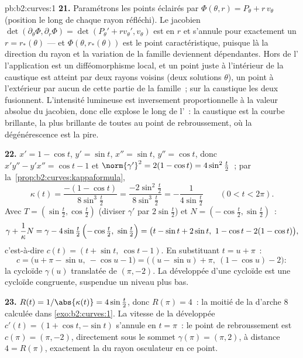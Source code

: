 \begin{solution}{pb:b2:curves:1}
\textbf{21.} Paramétrons les points éclairés par
$\Phi(\theta, r) = P_\theta + r\,v_\theta$ (position le long
de chaque rayon réfléchi). Le  jacobien
$\det(\partial_\theta\Phi, \partial_r\Phi) =
\det(P_\theta' + rv_\theta', v_\theta)$ est  en $r$ et
s'annule pour exactement un $r = r_*(\theta)$ --- et
$\Phi(\theta, r_*(\theta))$ est le point caractéristique, puisque
là la direction du rayon et la variation de la famille deviennent
dépendantes. Hors de l' l'application est un
difféomorphisme local, et un point juste à l'intérieur de la
caustique est atteint par deux rayons voisins
(deux solutions $\theta$), un point à l'extérieur par aucun de
cette partie de la famille~; sur la caustique les deux fusionnent.
L'intensité lumineuse est inversement proportionnelle à la valeur
absolue du jacobien, donc elle explose le long de l'~: la
caustique est la
courbe brillante, la plus brillante de toutes au point de
rebroussement, où la dégénérescence est la pire.

\textbf{22.} $x' = 1 - \cos t$, $y' = \sin t$, $x'' = \sin
t$, $y'' = \cos t$, donc $x'y'' - y'x'' = \cos t - 1$ et
$\norm{\gamma'}^2 = 2(1 - \cos t) = 4\sin^2\tfrac t2$~;
par la~\cref{prop:b2:curves:kappaformula},
\[
\kappa(t) = \frac{-(1 - \cos t)}{8\sin^3\tfrac t2}
= \frac{-2\sin^2\tfrac t2}{8\sin^3\tfrac t2}
= -\frac1{4\sin\tfrac t2}
\qquad (0 < t < 2\pi).
\]
Avec $T = (\sin\tfrac t2, \cos\tfrac t2)$ (diviser $\gamma'$
par $2\sin\tfrac t2$) et $N = (-\cos\tfrac t2, \sin\tfrac
t2)$~:
\[
\gamma + \frac1\kappa N
= \gamma - 4\sin\tfrac t2\,\Bigl(-\cos\tfrac t2,\
\sin\tfrac t2\Bigr)
= \bigl(t - \sin t + 2\sin t,\ 1 - \cos t - 2(1 - \cos
t)\bigr),
\]
c'est-à-dire $c(t) = (t + \sin t,\ \cos t - 1)$. En substituant $t = u
+ \pi$~:
\[
c = \bigl(u + \pi - \sin u,\ -\cos u - 1\bigr)
= \bigl((u - \sin u) + \pi,\ (1 - \cos u) - 2\bigr) :
\]
la cycloïde $\gamma(u)$ translatée de $(\pi, -2)$. La
développée d'une cycloïde est une cycloïde congruente, suspendue
un niveau plus bas.

\textbf{23.} $R(t) = 1/\abs{\kappa(t)} = 4\sin\tfrac t2$, donc
$R(\pi) = 4$~: la moitié de la  d'arche $8$ calculée dans
\cref{exo:b2:curves:1}. La vitesse de la développée $c'(t) = (1 +
\cos t, -\sin t)$ s'annule en $t = \pi$~: le point de
rebroussement est $c(\pi)
= (\pi, -2)$, directement sous le sommet $\gamma(\pi) = (\pi,
2)$, à distance $4 = R(\pi)$, exactement la  du
rayon osculateur en ce point.


\end{solution}
